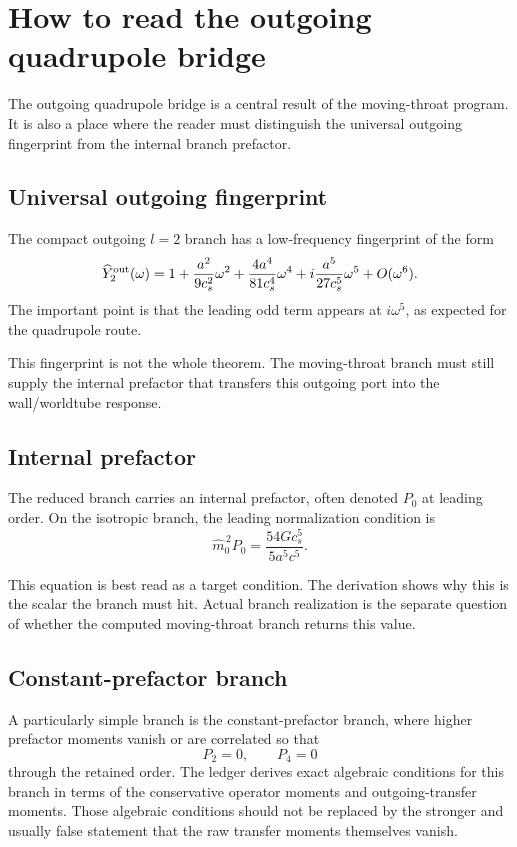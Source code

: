 \section{How to read the outgoing quadrupole bridge}
\label{sec:how-to-read-outgoing-bridge}

The outgoing quadrupole bridge is a central result of the moving-throat program.  It is also a place where the reader must distinguish the universal outgoing fingerprint from the internal branch prefactor.

\subsection{Universal outgoing fingerprint}
\label{subsec:universal-outgoing-fingerprint}

The compact outgoing \(l=2\) branch has a low-frequency fingerprint of the form
\[
\widehat Y_2^{\rm out}(\omega)
=
1+\frac{a^2}{9c_s^2}\omega^2
+\frac{4a^4}{81c_s^4}\omega^4
+i\frac{a^5}{27c_s^5}\omega^5
+O(\omega^6).
\]
The important point is that the leading odd term appears at \(i\omega^5\), as expected for the quadrupole route.

This fingerprint is not the whole theorem.  The moving-throat branch must still supply the internal prefactor that transfers this outgoing port into the wall/worldtube response.

\subsection{Internal prefactor}
\label{subsec:internal-prefactor}

The reduced branch carries an internal prefactor, often denoted \(P_0\) at leading order.  On the isotropic branch, the leading normalization condition is
\[
\widehat m_0^{\,2}P_0
=
\frac{54G c_s^5}{5a^5c^5}.
\]

This equation is best read as a target condition.  The derivation shows why this is the scalar the branch must hit.  Actual branch realization is the separate question of whether the computed moving-throat branch returns this value.

\subsection{Constant-prefactor branch}
\label{subsec:constant-prefactor-branch}

A particularly simple branch is the constant-prefactor branch, where higher prefactor moments vanish or are correlated so that
\[
P_2=0,
\qquad
P_4=0
\]
through the retained order.  The ledger derives exact algebraic conditions for this branch in terms of the conservative operator moments and outgoing-transfer moments.  Those algebraic conditions should not be replaced by the stronger and usually false statement that the raw transfer moments themselves vanish.

